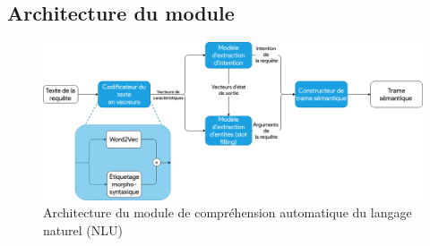 	\subsection{Architecture du module}
	\begin{figure}[H] 
		\label{nlu_arch}
		\centering
		\includegraphics[width=\linewidth]{images/Conception/NLU/nlu_module_arch.png}
		\caption{Architecture du module de compréhension automatique du langage naturel (NLU)}
	\end{figure}

